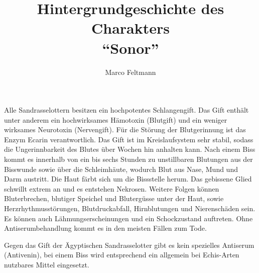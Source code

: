 \documentclass{article}
\author{Marco Feltmann}
\title{Hintergrundgeschichte des Charakters \\ \enquote{Sonor} }
\begin{document}
	\maketitle

Alle Sandrasselottern besitzen ein hochpotentes Schlangengift. Das Gift enthält
unter anderem ein hochwirksames Hämotoxin (Blutgift) und ein weniger wirksames
Neurotoxin (Nervengift). Für die Störung der Blutgerinnung ist das Enzym Ecarin
verantwortlich. Das Gift ist im Kreislaufsystem sehr stabil, sodass die
Ungerinnbarkeit des Blutes über Wochen hin anhalten kann. Nach einem Biss kommt
es innerhalb von ein bis sechs Stunden zu unstillbaren Blutungen aus der
Bisswunde sowie über die Schleimhäute, wodurch Blut aus Nase, Mund und Darm
austritt. Die Haut färbt sich um die Bissstelle herum. Das gebissene Glied
schwillt extrem an und es entstehen Nekrosen. Weitere Folgen können
Bluterbrechen, blutiger Speichel und Blutergüsse unter der Haut, sowie
Herzrhythmusstörungen, Blutdruckabfall, Hirnblutungen und Nierenschäden sein. Es
können auch Lähmungserscheinungen und ein Schockzustand auftreten. Ohne
Antiserumbehandlung kommt es in den meisten Fällen zum Tode.

Gegen das Gift der Ägyptischen Sandrasselotter gibt es kein spezielles Antiserum
(Antivenin), bei einem Biss wird entsprechend ein allgemein bei Echis-Arten
nutzbares Mittel eingesetzt.
\end{document}
